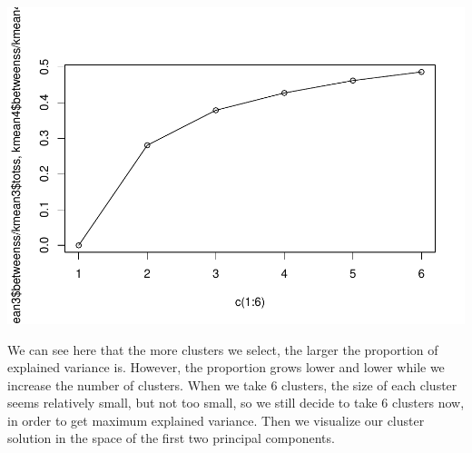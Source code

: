 \documentclass[
  11pt,
]{article}
\newenvironment{Shaded}{\begin{snugshade}}{\end{snugshade}}
\newcommand{\AttributeTok}[1]{\textcolor[rgb]{0.77,0.63,0.00}{#1}}
\newcommand{\DecValTok}[1]{\textcolor[rgb]{0.00,0.00,0.81}{#1}}
\newcommand{\FunctionTok}[1]{\textcolor[rgb]{0.00,0.00,0.00}{#1}}
\newcommand{\NormalTok}[1]{#1}
\newcommand{\SpecialCharTok}[1]{\textcolor[rgb]{0.00,0.00,0.00}{#1}}
\newcommand{\StringTok}[1]{\textcolor[rgb]{0.31,0.60,0.02}{#1}}
\begin{document}
\includegraphics{report_files/figure-latex/Task_3_88-1.pdf}

We can see here that the more clusters we select, the larger the proportion of explained variance is. However, the proportion grows lower and lower while we increase the number of clusters.
When we take 6 clusters, the size of each cluster seems relatively small, but not too small, so we still decide to take 6 clusters now, in order to get maximum explained variance.
Then we visualize our cluster solution in the space of the first two principal components.

\begin{Shaded}
\end{Shaded}
\end{document}
